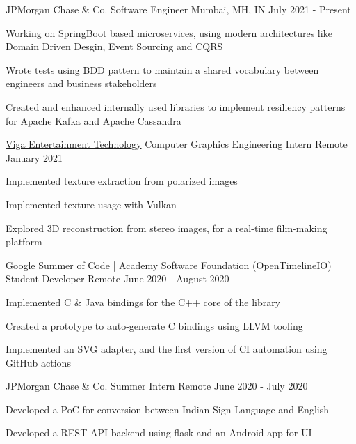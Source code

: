 \begin{cventries}
\cventry    
    {JPMorgan Chase \& Co.}
    {Software Engineer}
    {Mumbai, MH, IN}
    {July 2021 - Present}
    {
      \begin{cvitems}
      \item{Working on SpringBoot based microservices, using modern architectures like \\Domain Driven Desgin, Event Sourcing and CQRS}
      \item {Wrote tests using BDD pattern to maintain a shared vocabulary between engineers and business stakeholders}
      \item {Created and enhanced internally used libraries to implement resiliency patterns \\for Apache Kafka and Apache Cassandra}
      \end{cvitems} 
    }
\cventry    
	{\href{https://www.vigaet.com/}{Viga Entertainment Technology}}
	{Computer Graphics Engineering Intern}
	{Remote}
	{January 2021}
	{
		\begin{cvitems}
			\item{Implemented texture extraction from polarized images}
			\item{Implemented texture usage with Vulkan}
			\item {Explored 3D reconstruction from stereo images, for a real-time film-making platform}
		\end{cvitems} 
	}
\cventry    
	{Google Summer of Code | Academy Software Foundation (\href{https://github.com/AcademySoftwareFoundation/OpenTimelineIO}{OpenTimelineIO})}
	{Student Developer}
	{Remote}
	{June 2020 - August 2020}
	{
		\begin{cvitems}
			\item{Implemented C \& Java bindings for the C++ core of the library}
			\item{Created a prototype to auto-generate C bindings using LLVM tooling}
			\item {Implemented an SVG adapter, and the first version of CI automation using GitHub actions}
		\end{cvitems} 
	}
\cventry    
	{JPMorgan Chase \& Co.}
	{Summer Intern}
	{Remote}
	{June 2020 - July 2020}
	{
		\begin{cvitems}
			\item{Developed a PoC for conversion between Indian Sign Language and English}
			\item{Developed a REST API backend using flask and an Android app for UI}

\end{cvitems}}
\end{cventries}
